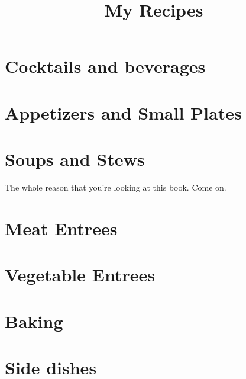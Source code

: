 \documentclass[12pt]{cookbook}
\title{My Recipes}
\begin{document}
\chapter*{Cocktails and beverages}
\pagebreak


\chapter*{Appetizers and Small Plates}
\chapter*{Soups and Stews}
The whole reason that you're looking at this book. Come on.
\pagebreak





\chapter*{Meat Entrees}
\pagebreak


\chapter*{Vegetable Entrees}
\pagebreak


\chapter*{Baking}
\pagebreak
 \chapter*{Side dishes}
\pagebreak


\end{document}
